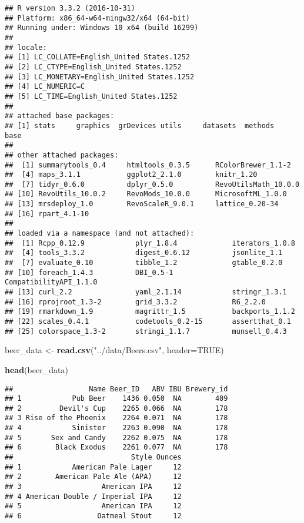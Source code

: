 \documentclass[]{article}
\newenvironment{Shaded}{\begin{snugshade}}{\end{snugshade}}
\newcommand{\KeywordTok}[1]{\textcolor[rgb]{0.13,0.29,0.53}{\textbf{#1}}}
\newcommand{\DataTypeTok}[1]{\textcolor[rgb]{0.13,0.29,0.53}{#1}}
\newcommand{\StringTok}[1]{\textcolor[rgb]{0.31,0.60,0.02}{#1}}
\newcommand{\OtherTok}[1]{\textcolor[rgb]{0.56,0.35,0.01}{#1}}
\newcommand{\NormalTok}[1]{#1}
\begin{document}
\begin{verbatim}
## R version 3.3.2 (2016-10-31)
## Platform: x86_64-w64-mingw32/x64 (64-bit)
## Running under: Windows 10 x64 (build 16299)
## 
## locale:
## [1] LC_COLLATE=English_United States.1252 
## [2] LC_CTYPE=English_United States.1252   
## [3] LC_MONETARY=English_United States.1252
## [4] LC_NUMERIC=C                          
## [5] LC_TIME=English_United States.1252    
## 
## attached base packages:
## [1] stats     graphics  grDevices utils     datasets  methods   base     
## 
## other attached packages:
##  [1] summarytools_0.4     htmltools_0.3.5      RColorBrewer_1.1-2  
##  [4] maps_3.1.1           ggplot2_2.1.0        knitr_1.20          
##  [7] tidyr_0.6.0          dplyr_0.5.0          RevoUtilsMath_10.0.0
## [10] RevoUtils_10.0.2     RevoMods_10.0.0      MicrosoftML_1.0.0   
## [13] mrsdeploy_1.0        RevoScaleR_9.0.1     lattice_0.20-34     
## [16] rpart_4.1-10        
## 
## loaded via a namespace (and not attached):
##  [1] Rcpp_0.12.9            plyr_1.8.4             iterators_1.0.8       
##  [4] tools_3.3.2            digest_0.6.12          jsonlite_1.1          
##  [7] evaluate_0.10          tibble_1.2             gtable_0.2.0          
## [10] foreach_1.4.3          DBI_0.5-1              CompatibilityAPI_1.1.0
## [13] curl_2.2               yaml_2.1.14            stringr_1.3.1         
## [16] rprojroot_1.3-2        grid_3.3.2             R6_2.2.0              
## [19] rmarkdown_1.9          magrittr_1.5           backports_1.1.2       
## [22] scales_0.4.1           codetools_0.2-15       assertthat_0.1        
## [25] colorspace_1.3-2       stringi_1.1.7          munsell_0.4.3
\end{verbatim}

\begin{Shaded}
\begin{Highlighting}[]
\NormalTok{beer_data <-}\StringTok{ }\KeywordTok{read.csv}\NormalTok{(}\StringTok{"../data/Beers.csv"}\NormalTok{, }\DataTypeTok{header=}\OtherTok{TRUE}\NormalTok{)}


\KeywordTok{head}\NormalTok{(beer_data)}
\end{Highlighting}
\end{Shaded}

\begin{verbatim}
##                  Name Beer_ID   ABV IBU Brewery_id
## 1            Pub Beer    1436 0.050  NA        409
## 2         Devil's Cup    2265 0.066  NA        178
## 3 Rise of the Phoenix    2264 0.071  NA        178
## 4            Sinister    2263 0.090  NA        178
## 5       Sex and Candy    2262 0.075  NA        178
## 6        Black Exodus    2261 0.077  NA        178
##                            Style Ounces
## 1            American Pale Lager     12
## 2        American Pale Ale (APA)     12
## 3                   American IPA     12
## 4 American Double / Imperial IPA     12
## 5                   American IPA     12
## 6                  Oatmeal Stout     12
\end{verbatim}
\end{document}
